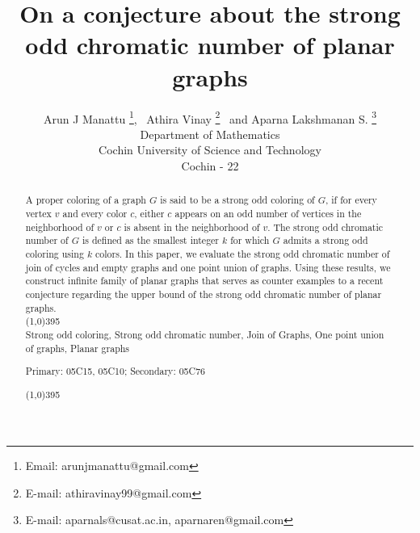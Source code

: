 \documentclass[12pt,a4paper]{article}
\theoremstyle{definition}
\numberwithin{equation}{section}
\begin{document}
\title{On a conjecture about the strong odd chromatic number of planar graphs}

\author {Arun J Manattu \footnote{Email: arunjmanattu@gmail.com},~ Athira Vinay \footnote{E-mail: athiravinay99@gmail.com}~ and Aparna Lakshmanan S. \footnote{E-mail: aparnals@cusat.ac.in, aparnaren@gmail.com}\\
Department of Mathematics\\	Cochin University of Science and Technology\\Cochin -
	22}
\maketitle
\begin{abstract}
A proper coloring of a graph $G$ is said to be a strong odd coloring of $G$, if for every vertex $v$ and every color $c$, either $c$ appears on an odd number of vertices in the neighborhood of $v$ or $c$ is absent in the neighborhood of $v$. The strong odd chromatic number of $G$ is defined as the smallest integer $k$ for which $G$ admits a strong odd coloring using $k$ colors. In this paper, we evaluate the strong odd chromatic number of join of cycles and empty graphs and one point union of graphs. Using these results, we construct infinite family of planar graphs that serves as counter examples to a recent conjecture regarding the upper bound of the strong odd chromatic number of planar graphs. \\
\noindent \line(1,0){395}\\
 Strong odd coloring, Strong odd chromatic number, Join of Graphs, One point union of graphs, Planar graphs

 Primary: 05C15, 05C10; Secondary: 05C76 

\noindent \line(1,0){395}
\end{abstract}

\maketitle
\end{document}
